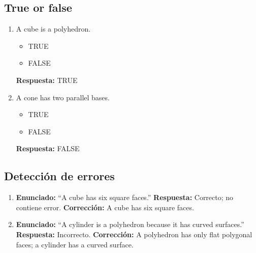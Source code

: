 \documentclass[11pt,a4paper]{article}
\begin{document}
\subsection{True or false}
\begin{enumerate}
\item A cube is a polyhedron.
\begin{itemize}
\item TRUE
\item FALSE
\end{itemize}
\textbf{Respuesta:} TRUE
\item A cone has two parallel bases.
\begin{itemize}
\item TRUE
\item FALSE
\end{itemize}
\textbf{Respuesta:} FALSE
\end{enumerate}
\subsection{Detecci\'on de errores}
\begin{enumerate}
\item \textbf{Enunciado:} \textquotedblleft A cube has six square faces.\textquotedblright
\textbf{Respuesta:} Correcto; no contiene error.
\textbf{Correcci\'on:} A cube has six square faces.
\item \textbf{Enunciado:} \textquotedblleft A cylinder is a polyhedron because it has curved surfaces.\textquotedblright
\textbf{Respuesta:} Incorrecto.
\textbf{Correcci\'on:} A polyhedron has only flat polygonal faces; a cylinder has a curved surface.
\end{enumerate}
\end{document}
